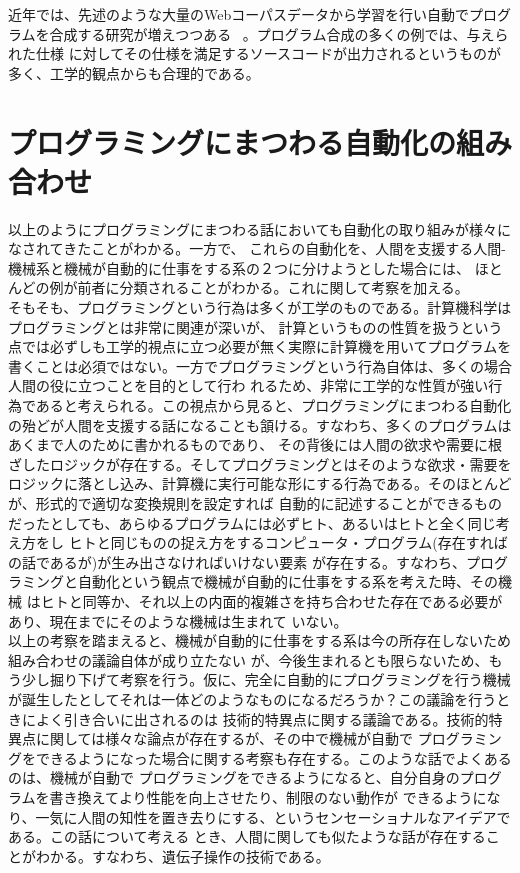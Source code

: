 \documentclass[10pt,a4paper]{ltjsarticle}       %
\begin{document}
近年では、先述のような大量のWebコーパスデータから学習を行い自動でプログラムを合成する研究が増えつつある
~\cite{lin2017program}\cite{parisotto2016neuro}。プログラム合成の多くの例では、与えられた仕様
に対してその仕様を満足するソースコードが出力されるというものが多く、工学的観点からも合理的である。
\section{プログラミングにまつわる自動化の組み合わせ}
以上のようにプログラミングにまつわる話においても自動化の取り組みが様々になされてきたことがわかる。一方で、
これらの自動化を、人間を支援する人間-機械系と機械が自動的に仕事をする系の２つに分けようとした場合には、
ほとんどの例が前者に分類されることがわかる。これに関して考察を加える。\\

そもそも、プログラミングという行為は多くが工学のものである。計算機科学はプログラミングとは非常に関連が深いが、
計算というものの性質を扱うという点では必ずしも工学的視点に立つ必要が無く実際に計算機を用いてプログラムを
書くことは必須ではない。一方でプログラミングという行為自体は、多くの場合人間の役に立つことを目的として行わ
れるため、非常に工学的な性質が強い行為であると考えられる。この視点から見ると、プログラミングにまつわる自動化
の殆どが人間を支援する話になることも頷ける。すなわち、多くのプログラムはあくまで人のために書かれるものであり、
その背後には人間の欲求や需要に根ざしたロジックが存在する。そしてプログラミングとはそのような欲求・需要を
ロジックに落とし込み、計算機に実行可能な形にする行為である。そのほとんどが、形式的で適切な変換規則を設定すれば
自動的に記述することができるものだったとしても、あらゆるプログラムには必ずヒト、あるいはヒトと全く同じ考え方をし
ヒトと同じものの捉え方をするコンピュータ・プログラム(存在すればの話であるが)が生み出さなければいけない要素
が存在する。すなわち、プログラミングと自動化という観点で機械が自動的に仕事をする系を考えた時、その機械
はヒトと同等か、それ以上の内面的複雑さを持ち合わせた存在である必要があり、現在までにそのような機械は生まれて
いない。\\

以上の考察を踏まえると、機械が自動的に仕事をする系は今の所存在しないため組み合わせの議論自体が成り立たない
が、今後生まれるとも限らないため、もう少し掘り下げて考察を行う。仮に、完全に自動的にプログラミングを行う機械
が誕生したとしてそれは一体どのようなものになるだろうか？この議論を行うときによく引き合いに出されるのは
技術的特異点に関する議論である。技術的特異点に関しては様々な論点が存在するが、その中で機械が自動で
プログラミングをできるようになった場合に関する考察も存在する。このような話でよくあるのは、機械が自動で
プログラミングをできるようになると、自分自身のプログラムを書き換えてより性能を向上させたり、制限のない動作が
できるようになり、一気に人間の知性を置き去りにする、というセンセーショナルなアイデアである。この話について考える
とき、人間に関しても似たような話が存在することがわかる。すなわち、遺伝子操作の技術である。\\
\end{document}

